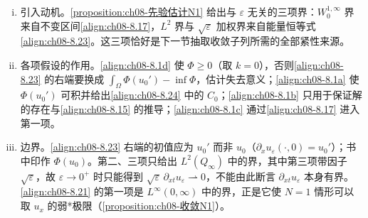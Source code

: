 \documentclass[../../main.tex]{subfiles}%
\begin{document}
\begin{remark}\label{remark:ch08-先验估计N1动机}
\begin{enumerate}[(i)]
\item 引入动机。\cref{proposition:ch08-先验估计N1} 给出与 $\varepsilon$ 无关的三项界：$W^{1,\infty}_0$ 界来自不变区间\eqref{align:ch08-8.17}，$L^2$ 界与 $\sqrt{\varepsilon}$ 加权界来自能量恒等式\eqref{align:ch08-8.23}。这三项恰好是下一节抽取收敛子列所需的全部紧性来源。
\item 各项假设的作用。\eqref{align:ch08-8.1d} 使 $\Phi\geqslant0$（取 $k=0$），否则\eqref{align:ch08-8.23} 的右端要换成 $\int_\Omega\Phi(u_0')-\inf\Phi$，估计失去意义；\eqref{align:ch08-8.1a} 使 $\Phi(u_0')$ 可积并给出\eqref{align:ch08-8.24} 中的 $C_0$；\eqref{align:ch08-8.1b} 只用于保证解的存在与\eqref{align:ch08-8.15} 的推导；\eqref{align:ch08-8.1c} 通过\eqref{align:ch08-8.17} 进入第一项。
\item 边界。\eqref{align:ch08-8.23} 右端的初值应为 $u_0'$ 而非 $u_0$（$\partial_xu_\varepsilon(\cdot,0)=u_0'$）；书中印作 $\Phi(u_0)$。第二、三项只给出 $L^2(Q_\infty)$ 中的界，其中第三项带因子 $\sqrt{\varepsilon}$，故 $\varepsilon\to0^+$ 时只能得到 $\sqrt{\varepsilon}\,\partial_{xt}u_\varepsilon\rightharpoonup0$，不能由此断言 $\partial_{xt}u_\varepsilon$ 本身有界。\eqref{align:ch08-8.21} 的第一项是 $L^\infty(0,\infty)$ 中的界，正是它使 $N=1$ 情形可以取 $u_x$ 的弱*极限（\cref{proposition:ch08-收敛N1}）。
\end{enumerate}
\end{remark}
\end{document}
